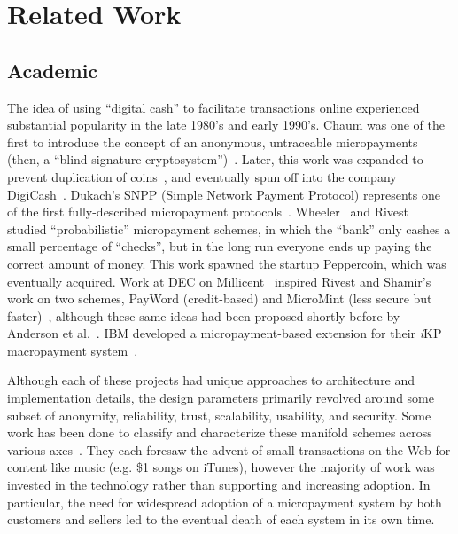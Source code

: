 \section{Related Work}

\subsection{Academic}
The idea of using ``digital cash'' to facilitate transactions online experienced substantial popularity in the late 1980's and early 1990's.
Chaum was one of the first to introduce the concept of an anonymous, untraceable micropayments (then, a ``blind signature cryptosystem'')~\cite{chaum1983blind}.
Later, this work was expanded to prevent duplication of coins~\cite{chaum1990untraceable}, and eventually spun off into the company DigiCash~\cite{schoenmakers1998security}.
Dukach's SNPP (Simple Network Payment Protocol) represents one of the first fully-described micropayment protocols~\cite{dukach1992snpp}.
Wheeler~\cite{wheeler1997transactions} and Rivest~\cite{rivest1997electronic} studied ``probabilistic'' micropayment schemes, in which the ``bank'' only cashes a small percentage of ``checks'', but in the long run everyone ends up paying the correct amount of money.
This work spawned the startup Peppercoin, which was eventually acquired.
Work at DEC on Millicent~\cite{manasse1995millicent} inspired Rivest and Shamir's work on two schemes, PayWord (credit-based) and MicroMint (less secure but faster)~\cite{rivest1997payword}, although these same ideas had been proposed shortly before by Anderson et al.~\cite{anderson1997netcard}.
IBM developed a micropayment-based extension for their \textit{i}KP macropayment system~\cite{hauser1996micro}.

Although each of these projects had unique approaches to architecture and implementation details, the design parameters primarily revolved around some subset of anonymity, reliability, trust, scalability, usability, and security. Some work has been done to classify and characterize these manifold schemes across various axes~\cite{abrazhevich2001classification,parhonyi2005second,parhonyi2006fall}. They each foresaw the advent of small transactions on the Web for content like music (e.g. \$1 songs on iTunes), however the majority of work was invested in the technology rather than supporting and increasing adoption. In particular, the need for widespread adoption of a micropayment system by both customers and sellers led to the eventual death of each system in its own time.

